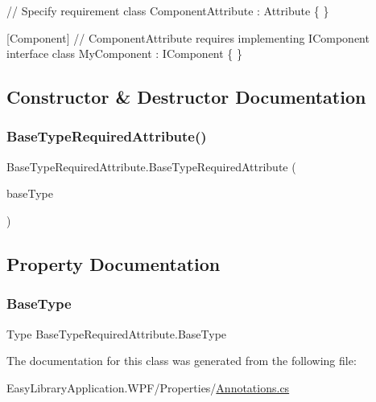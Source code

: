 \begin{DoxyCode}
 \textcolor{comment}{// Specify requirement}
\textcolor{keyword}{class} ComponentAttribute : Attribute \{ \}

[Component] \textcolor{comment}{// ComponentAttribute requires implementing IComponent interface}
\textcolor{keyword}{class }MyComponent : IComponent \{ \}
\end{DoxyCode}


\subsection{Constructor \& Destructor Documentation}
\mbox{\label{class_base_type_required_attribute_a3b535405fd33291328613b6ede4e5d8a}} 
\subsubsection{\texorpdfstring{Base\+Type\+Required\+Attribute()}{BaseTypeRequiredAttribute()}}
{\footnotesize\ttfamily Base\+Type\+Required\+Attribute.\+Base\+Type\+Required\+Attribute (\begin{DoxyParamCaption}\item[{\mbox{[}\+Not\+Null\mbox{]} Type}]{base\+Type }\end{DoxyParamCaption})}



\subsection{Property Documentation}
\mbox{\label{class_base_type_required_attribute_abd32451b36cd8eff34ecee4718e78f5b}} 
\subsubsection{\texorpdfstring{Base\+Type}{BaseType}}
{\footnotesize\ttfamily Type Base\+Type\+Required\+Attribute.\+Base\+Type\hspace{0.3cm}{\ttfamily [get]}}



The documentation for this class was generated from the following file\+:\begin{DoxyCompactItemize}
\item 
Easy\+Library\+Application.\+W\+P\+F/\+Properties/\mbox{\hyperlink{_annotations_8cs}{Annotations.\+cs}}\end{DoxyCompactItemize}
